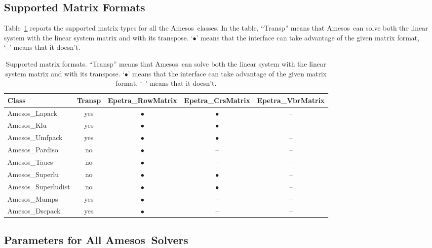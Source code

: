 \documentclass[11pt]{SANDreport}
\newcommand{\amesos}{{\sc Amesos}}
\begin{document}
\subsection{Supported Matrix Formats}
\label{sec:matrix}

Table~\ref{tab:matrices} reports the supported matrix types for all the 
\amesos\ classes. In the table, ``Transp'' means that \amesos\ 
can solve both the linear system with the linear system matrix and with 
its transpose.  `$\bullet$' means that the interface can take advantage of the given matrix 
format, `--' means that it doesn't.

\begin{table}[tbhp]
  \centering
  \begin{tabular}{| p{3.5cm} | c | c | c | c | }
    \hline
    Class & Transp & Epetra\_RowMatrix & Epetra\_CrsMatrix & Epetra\_VbrMatrix \\
    \hline
    Amesos\_Lapack       & yes & $\bullet$ & $\bullet$ & -- \\
    Amesos\_Klu          & yes & $\bullet$ & $\bullet$ & -- \\
    Amesos\_Umfpack      & yes & $\bullet$ & $\bullet$ & -- \\
    Amesos\_Pardiso      & no  & $\bullet$ & -- & -- \\
    Amesos\_Taucs        & no  & $\bullet$ & -- & -- \\
    Amesos\_Superlu      & no  & $\bullet$ & $\bullet$ & -- \\
    Amesos\_Superludist  & no  & $\bullet$ & $\bullet$ & -- \\
    Amesos\_Mumps        & yes & $\bullet$ & -- & -- \\
    Amesos\_Dscpack      & yes & $\bullet$        & -- & -- \\
    \hline
  \end{tabular}
  \caption{Supported matrix formats. ``Transp'' means that \amesos\
    can solve both the linear system with the linear system matrix and with its
transpose.
`$\bullet$' means that the interface
    can take advantage of the given matrix format, `--' means that it doesn't.}
  \label{tab:matrices}
\end{table}

\subsection{Parameters for All \amesos\ Solvers}
\label{sec:parameters}
\end{document}
